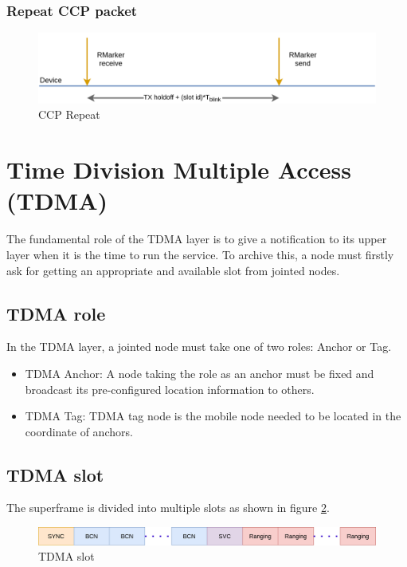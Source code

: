 \documentclass[\main/main.tex]{subfiles}
\begin{document}
\subsubsection{Repeat CCP packet}
\begin{figure}[H]
    \begin{center}
        \includegraphics[scale=0.35]{ccp_repeat.png}
    \end{center}
    \caption{CCP Repeat}
    \label{fig:ccp_repeat}
\end{figure}


\section{Time Division Multiple Access (TDMA)}
The fundamental role of the TDMA layer is to give a notification to its upper layer when it is the time to run the service. To archive this, a node must firstly ask for getting an appropriate and available slot from jointed nodes.

\subsection{TDMA role}
In the TDMA layer, a jointed node must take one of two roles: Anchor or Tag.
\begin{itemize}
    \item TDMA Anchor: A node taking the role as an anchor must be fixed and broadcast its pre-configured location information to others.
    \item TDMA Tag: TDMA tag node is the mobile node needed to be located in the coordinate of anchors.
\end{itemize}

\subsection{TDMA slot}
The superframe is divided into multiple slots as shown in figure \ref{fig:tdma_slot}.
\begin{figure}[H]
    \begin{center}
        \includegraphics[scale=0.4]{tdma_slot.png}
    \end{center}
    \caption{TDMA slot}
    \label{fig:tdma_slot}
\end{figure}
\end{document}
